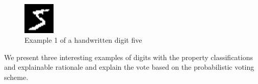 \documentclass[conference]{IEEEtran}
\begin{document}

 \begin{figure}[htbp]
\centerline{\includegraphics[width=15mm]{./digit-images/5-0.png}}
\caption{Example 1 of a handwritten digit five}
\label{example1}
\end{figure}

We present three interesting examples of digits with the property classifications and explainable rationale and explain the vote based on the probabilistic voting scheme.
\end{document}
